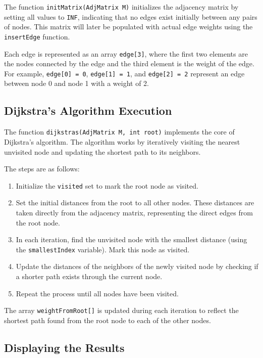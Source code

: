\documentclass{book}
\begin{document}
The function \texttt{initMatrix(AdjMatrix M)} initializes the adjacency matrix by setting all values to \texttt{INF}, indicating that no edges exist initially between any pairs of nodes. This matrix will later be populated with actual edge weights using the \texttt{insertEdge} function. 

Each edge is represented as an array \texttt{edge[3]}, where the first two elements are the nodes connected by the edge and the third element is the weight of the edge. For example, \texttt{edge[0] = 0}, \texttt{edge[1] = 1}, and \texttt{edge[2] = 2} represent an edge between node 0 and node 1 with a weight of 2.

\subsection{Dijkstra’s Algorithm Execution}

The function \texttt{dijkstras(AdjMatrix M, int root)} implements the core of Dijkstra’s algorithm. The algorithm works by iteratively visiting the nearest unvisited node and updating the shortest path to its neighbors.

The steps are as follows:
\begin{enumerate}
    \item Initialize the \texttt{visited} set to mark the root node as visited.
    \item Set the initial distances from the root to all other nodes. These distances are taken directly from the adjacency matrix, representing the direct edges from the root node.
    \item In each iteration, find the unvisited node with the smallest distance (using the \texttt{smallestIndex} variable). Mark this node as visited.
    \item Update the distances of the neighbors of the newly visited node by checking if a shorter path exists through the current node.
    \item Repeat the process until all nodes have been visited.
\end{enumerate}

The array \texttt{weightFromRoot[]} is updated during each iteration to reflect the shortest path found from the root node to each of the other nodes.

\subsection{Displaying the Results}
\end{document}
